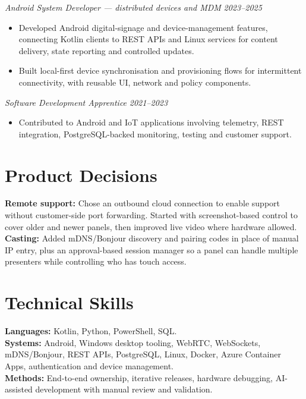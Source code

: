 \documentclass[11pt,a4paper]{article}
\begin{document}
\textit{Android System Developer --- distributed devices and MDM} \hfill \textit{2023--2025}
\begin{itemize}
  \item Developed Android digital-signage and device-management features, connecting Kotlin clients to REST APIs and Linux services for content delivery, state reporting and controlled updates.
  \item Built local-first device synchronisation and provisioning flows for intermittent connectivity, with reusable UI, network and policy components.
\end{itemize}

\textit{Software Development Apprentice} \hfill \textit{2021--2023}
\begin{itemize}
  \item Contributed to Android and IoT applications involving telemetry, REST integration, PostgreSQL-backed monitoring, testing and customer support.
\end{itemize}

\section*{Product Decisions}
\textbf{Remote support:} Chose an outbound cloud connection to enable support without customer-side port forwarding. Started with screenshot-based control to cover older and newer panels, then improved live video where hardware allowed.\\
\textbf{Casting:} Added mDNS/Bonjour discovery and pairing codes in place of manual IP entry, plus an approval-based session manager so a panel can handle multiple presenters while controlling who has touch access.

\section*{Technical Skills}
\textbf{Languages:} Kotlin, Python, PowerShell, SQL.\\
\textbf{Systems:} Android, Windows desktop tooling, WebRTC, WebSockets, mDNS/Bonjour, REST APIs, PostgreSQL, Linux, Docker, Azure Container Apps, authentication and device management.\\
\textbf{Methods:} End-to-end ownership, iterative releases, hardware debugging, AI-assisted development with manual review and validation.
\end{document}
